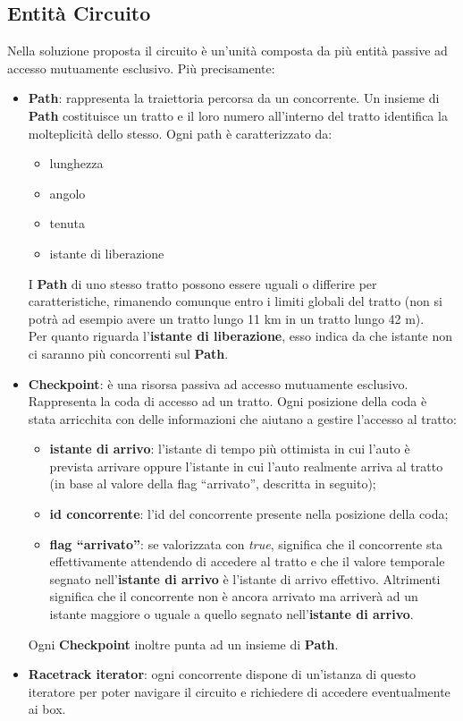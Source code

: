 \label{soluzione_problematiche}
\subsection{Entit\`{a} Circuito}
\label{entita_circuito}
Nella soluzione proposta il circuito è un'unità composta da più entità passive ad accesso mutuamente esclusivo. Più precisamente:
\begin{itemize}
\item \textbf{Path}: rappresenta la traiettoria percorsa da un concorrente. Un insieme di \textbf{Path} costituisce un tratto e il loro
numero all'interno del tratto identifica la molteplicità dello stesso. Ogni path è caratterizzato da:
\begin{itemize}
\item lunghezza
\item angolo
\item tenuta
\item istante di liberazione
\end{itemize}
I \textbf{Path} di uno stesso tratto possono essere uguali o differire per caratteristiche, rimanendo comunque entro i limiti globali del tratto
(non si potrà ad esempio avere un tratto lungo 11 km in un tratto lungo 42 m).\\
Per quanto riguarda l'\textbf{istante di liberazione}, esso indica da che istante non ci saranno più concorrenti sul \textbf{Path}.
\item \textbf{Checkpoint}: è una risorsa passiva ad accesso mutuamente esclusivo. Rappresenta la coda di accesso ad un tratto. Ogni posizione
della coda è stata arricchita con delle informazioni che aiutano a gestire l'accesso al tratto:
\begin{itemize}
\item \textbf{istante di arrivo}: l'istante di tempo più ottimista in cui l'auto è prevista arrivare oppure l'istante in cui l'auto realmente
arriva al tratto (in base al valore della flag ``arrivato'', descritta in seguito);
\item \textbf{id concorrente}: l'id del concorrente presente nella posizione della coda;
\item \textbf{flag ``arrivato''}: se valorizzata con \emph{true}, significa che il concorrente sta effettivamente attendendo di accedere al tratto
e che il valore temporale segnato nell'\textbf{istante di arrivo} è l'istante di arrivo effettivo. Altrimenti significa che il concorrente non
è ancora arrivato ma arriverà ad un istante maggiore o uguale a quello segnato nell'\textbf{istante di arrivo}.
\end{itemize}
Ogni \textbf{Checkpoint} inoltre punta ad un insieme di \textbf{Path}.
\item \textbf{Racetrack iterator}: ogni concorrente dispone di un'istanza di questo iteratore per poter navigare il circuito e richiedere
di accedere eventualmente ai box.
\end{itemize}
